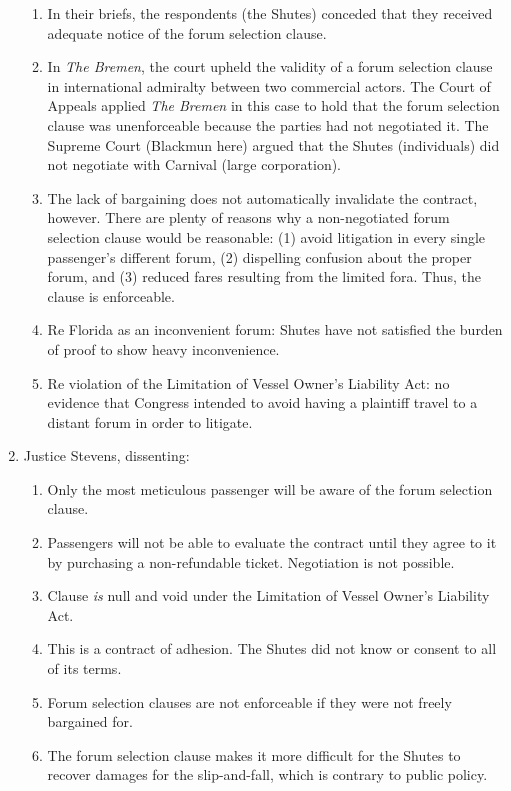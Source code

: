 \begin{enumerate}
    \begin{enumerate}
        \item In their briefs, the respondents (the Shutes) conceded that they received adequate notice of the forum selection clause.
        \item In \emph{The Bremen}, the court upheld the validity of a forum selection clause in international admiralty between two commercial actors. The Court of Appeals applied \emph{The Bremen} in this case to hold that the forum selection clause was unenforceable because the parties had not negotiated it. The Supreme Court (Blackmun here) argued that the Shutes (individuals) did not negotiate with Carnival (large corporation).
        \item The lack of bargaining does not automatically invalidate the contract, however. There are plenty of reasons why a non-negotiated forum selection clause would be reasonable: (1) avoid litigation in every single passenger's different forum, (2) dispelling confusion about the proper forum, and (3) reduced fares resulting from the limited fora. Thus, the clause is enforceable.
        \item Re Florida as an inconvenient forum: Shutes have not satisfied the burden of proof to show heavy inconvenience.
        \item Re violation of the Limitation of Vessel Owner's Liability Act: no evidence that Congress intended to avoid having a plaintiff travel to a distant forum in order to litigate.
    \end{enumerate}
    \item Justice Stevens, dissenting:
    \begin{enumerate}
        \item Only the most meticulous passenger will be aware of the forum selection clause.
        \item Passengers will not be able to evaluate the contract until they agree to it by purchasing a non-refundable ticket. Negotiation is not possible.
        \item Clause \emph{is} null and void under the Limitation of Vessel Owner's Liability Act.
        \item This is a contract of adhesion. The Shutes did not know or consent to all of its terms.
        \item Forum selection clauses are not enforceable if they were not freely bargained for.
        \item The forum selection clause makes it more difficult for the Shutes to recover damages for the slip-and-fall, which is contrary to public policy.

\end{enumerate}
\end{enumerate}
